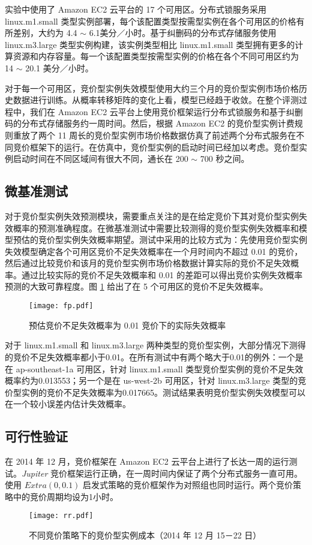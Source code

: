 实验中使用了 Amazon EC2 云平台的 17 个可用区。分布式锁服务采用 linux.m1.small 类型实例部署，每个该配置类型按需型实例在各个可用区的价格有所差别，大约为 4.4 $\sim$ 6.1美分／小时。基于纠删码的分布式存储服务使用 linux.m3.large 类型实例构建，该实例类型相比 linux.m1.small 类型拥有更多的计算资源和内存容量。每一个该配置类型按需型实例的价格在各个不同可用区约为 14 $\sim$ 20.1 美分／小时。

对于每一个可用区，竞价型实例失效模型使用大约三个月的竞价型实例市场价格历史数据进行训练。从概率转移矩阵的变化上看，模型已经趋于收敛。在整个评测过程中，我们在 Amazon EC2 云平台上使用竞价框架运行分布式锁服务和基于纠删码的分布式存储服务约一周时间。然后，根据 Amazon EC2 的竞价型实例计费规则重放了两个 11 周长的竞价型实例市场价格数据仿真了前述两个分布式服务在不同竞价框架下的运行。在仿真中，竞价型实例的启动时间已经加以考虑。竞价型实例启动时间在不同区域间有很大不同，通长在 200 $\sim$ 700 秒之间\cite{Mao:2012:PSV:2353730.2353859}。

\subsection{微基准测试}
对于竞价型实例失效预测模块，需要重点关注的是在给定竞价下其对竞价型实例失效概率的预测准确程度。在微基准测试中需要比较测得的竞价型实例失效概率和模型预估的竞价型实例失效概率期望。测试中采用的比较方式为：先使用竞价型实例失效模型确定各个可用区竞价不足失效概率在一个月时间内不超过 0.01 的竞价，然后通过比较竞价和该月的竞价型实例市场价格数据计算实际的竞价不足失效概率。通过比较实际的竞价不足失效概率和 0.01 的差距可以得出竞价实例失效概率预测的大致可靠程度。图 \ref{figure:fp} 给出了在 5 个可用区的竞价不足失效概率。
\begin{figure}
  \centering
  \texttt{[image: fp.pdf]}
  \caption{预估竞价不足失效概率为 0.01 竞价下的实际失效概率}
  \label{figure:fp}
\end{figure}

对于 linux.m1.small 和 linux.m3.large 两种类型的竞价型实例，大部分情况下测得的竞价不足失效概率都小于0.01。在所有测试中有两个略大于0.01的例外：一个是在 ap-southeast-1a 可用区，针对 linux.m1.small 类型竞价型实例的竞价不足失效概率约为0.013553；另一个是在 us-west-2b 可用区，针对 linux.m3.large 类型的竞价型实例的竞价不足失效概率为0.017665。测试结果表明竞价型实例失效模型可以在一个较小误差内估计失效概率。

\subsection{可行性验证}
在 2014 年 12 月，竞价框架在 Amazon EC2 云平台上进行了长达一周的运行测试。\emph{Jupiter} 竞价框架运行正确，在一周时间内保证了两个分布式服务一直可用。使用 $Extra(0, 0.1)$ 启发式策略的竞价框架作为对照组也同时运行。两个竞价策略中的竞价周期均设为1小时。
\begin{figure}
  \centering
  \texttt{[image: rr.pdf]}
  \caption{不同竞价策略下的竞价型实例成本（2014 年 12 月 15－22 日）}
  \label{figure:rr}
\end{figure}

